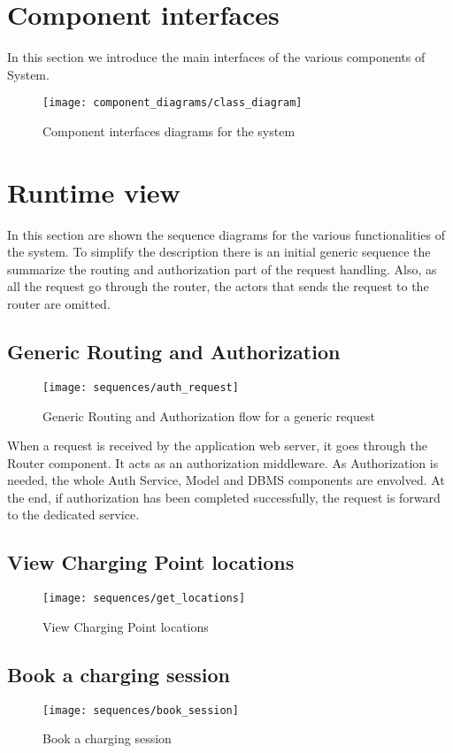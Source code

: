 \clearpage
\newpage

\section{Component interfaces}
In this section we introduce the main interfaces of the various components of System. 
\begin{figure}[h]
\texttt{[image: component\_diagrams/class\_diagram]}
\caption{Component interfaces diagrams for the system}
\end{figure}

\clearpage
\newpage


\section{Runtime view}
In this section are shown the sequence diagrams for the various functionalities of the system. To simplify the description there is an initial generic sequence the summarize the routing and authorization part of the request handling. Also, as all the request go through the router, the actors that sends the request to the router are omitted.

\subsection{Generic Routing and Authorization}
\begin{figure}[h]
\texttt{[image: sequences/auth\_request]}
\caption{Generic Routing and Authorization flow for a generic request}
\end{figure}

When a request is received by the application web server, it goes through the Router component. It acts as an authorization middleware. 
As Authorization is needed, the whole Auth Service, Model and DBMS components are envolved.
At the end, if authorization has been completed successfully, the request is forward to the dedicated service.


\subsection{View Charging Point locations}
\begin{figure}[h]
\texttt{[image: sequences/get\_locations]}
\caption{View Charging Point locations}
\end{figure}
\clearpage

\subsection{Book a charging session}
\begin{figure}[h]
\texttt{[image: sequences/book\_session]}
\caption{Book a charging session}
\end{figure}

